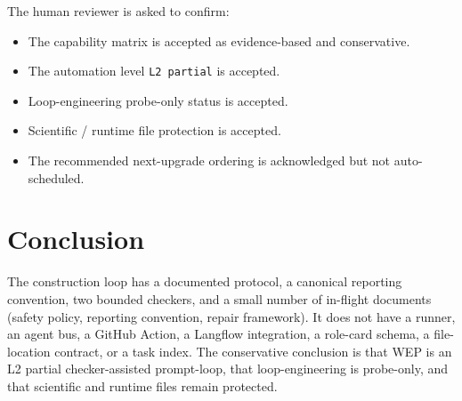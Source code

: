 \documentclass[11pt,a4paper]{article}
\begin{document}
The human reviewer is asked to confirm:

\begin{itemize}[leftmargin=2em]
  \item The capability matrix is accepted as evidence-based and
        conservative.
  \item The automation level \texttt{L2 partial} is accepted.
  \item Loop-engineering probe-only status is accepted.
  \item Scientific / runtime file protection is accepted.
  \item The recommended next-upgrade ordering is acknowledged but not
        auto-scheduled.
\end{itemize}

\section{Conclusion}

The construction loop has a documented protocol, a canonical reporting
convention, two bounded checkers, and a small number of in-flight
documents (safety policy, reporting convention, repair framework). It
does not have a runner, an agent bus, a GitHub Action, a Langflow
integration, a role-card schema, a file-location contract, or a task
index. The conservative conclusion is that WEP is an L2 partial
checker-assisted prompt-loop, that loop-engineering is probe-only, and
that scientific and runtime files remain protected.
\end{document}

